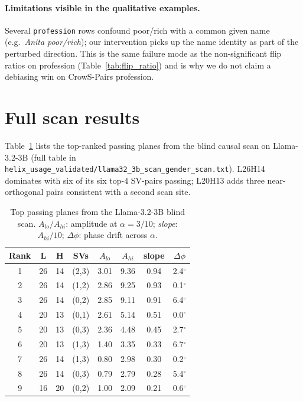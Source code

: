 \paragraph{Limitations visible in the qualitative examples.}
Several \texttt{profession} rows confound poor/rich with a common
given name (e.g.\ \emph{Anita poor/rich}); our intervention picks up
the name identity as part of the perturbed direction. This is the
same failure mode as the non-significant flip ratios on profession
(Table~\ref{tab:flip_ratio}) and is why we do not claim a debiasing
win on CrowS-Pairs profession.

\section{Full scan results}
\label{app:scan}

Table~\ref{tab:llama_top_planes} lists the top-ranked passing planes
from the blind causal scan on Llama-3.2-3B (full table in
\texttt{helix\_usage\_validated/llama32\_3b\_scan\_gender\_scan.txt}).
L26H14 dominates with six of its six top-$4$ SV-pairs passing; L20H13
adds three near-orthogonal pairs consistent with a second scan site.

\begin{table}[h]
\centering
\small
\caption{Top passing planes from the Llama-3.2-3B blind scan.
$A_{lo}/A_{hi}$: amplitude at $\alpha = 3/10$; \emph{slope}: $A_{hi}/10$;
$\Delta\phi$: phase drift across $\alpha$.}
\label{tab:llama_top_planes}
\begin{tabular}{cccccccc}
\toprule
Rank & L & H & SVs & $A_{lo}$ & $A_{hi}$ & slope & $\Delta\phi$ \\
\midrule
1 & 26 & 14 & (2,3) & 3.01 & 9.36 & 0.94 & 2.4$^\circ$ \\
2 & 26 & 14 & (1,2) & 2.86 & 9.25 & 0.93 & 0.1$^\circ$ \\
3 & 26 & 14 & (0,2) & 2.85 & 9.11 & 0.91 & 6.4$^\circ$ \\
4 & 20 & 13 & (0,1) & 2.61 & 5.14 & 0.51 & 0.0$^\circ$ \\
5 & 20 & 13 & (0,3) & 2.36 & 4.48 & 0.45 & 2.7$^\circ$ \\
6 & 20 & 13 & (1,3) & 1.40 & 3.35 & 0.33 & 6.7$^\circ$ \\
7 & 26 & 14 & (1,3) & 0.80 & 2.98 & 0.30 & 0.2$^\circ$ \\
8 & 26 & 14 & (0,3) & 0.79 & 2.79 & 0.28 & 5.4$^\circ$ \\
9 & 16 & 20 & (0,2) & 1.00 & 2.09 & 0.21 & 0.6$^\circ$ \\
\bottomrule
\end{tabular}
\end{table}
